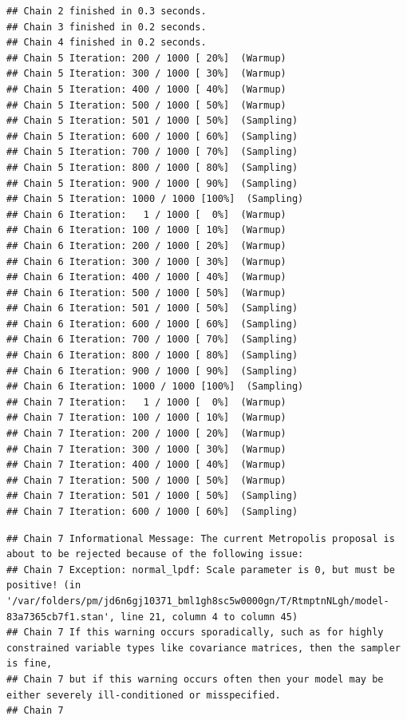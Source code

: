 \documentclass[
]{book}
\begin{document}
\begin{verbatim}
## Chain 2 finished in 0.3 seconds.
## Chain 3 finished in 0.2 seconds.
## Chain 4 finished in 0.2 seconds.
## Chain 5 Iteration: 200 / 1000 [ 20%]  (Warmup) 
## Chain 5 Iteration: 300 / 1000 [ 30%]  (Warmup) 
## Chain 5 Iteration: 400 / 1000 [ 40%]  (Warmup) 
## Chain 5 Iteration: 500 / 1000 [ 50%]  (Warmup) 
## Chain 5 Iteration: 501 / 1000 [ 50%]  (Sampling) 
## Chain 5 Iteration: 600 / 1000 [ 60%]  (Sampling) 
## Chain 5 Iteration: 700 / 1000 [ 70%]  (Sampling) 
## Chain 5 Iteration: 800 / 1000 [ 80%]  (Sampling) 
## Chain 5 Iteration: 900 / 1000 [ 90%]  (Sampling) 
## Chain 5 Iteration: 1000 / 1000 [100%]  (Sampling) 
## Chain 6 Iteration:   1 / 1000 [  0%]  (Warmup) 
## Chain 6 Iteration: 100 / 1000 [ 10%]  (Warmup) 
## Chain 6 Iteration: 200 / 1000 [ 20%]  (Warmup) 
## Chain 6 Iteration: 300 / 1000 [ 30%]  (Warmup) 
## Chain 6 Iteration: 400 / 1000 [ 40%]  (Warmup) 
## Chain 6 Iteration: 500 / 1000 [ 50%]  (Warmup) 
## Chain 6 Iteration: 501 / 1000 [ 50%]  (Sampling) 
## Chain 6 Iteration: 600 / 1000 [ 60%]  (Sampling) 
## Chain 6 Iteration: 700 / 1000 [ 70%]  (Sampling) 
## Chain 6 Iteration: 800 / 1000 [ 80%]  (Sampling) 
## Chain 6 Iteration: 900 / 1000 [ 90%]  (Sampling) 
## Chain 6 Iteration: 1000 / 1000 [100%]  (Sampling) 
## Chain 7 Iteration:   1 / 1000 [  0%]  (Warmup) 
## Chain 7 Iteration: 100 / 1000 [ 10%]  (Warmup) 
## Chain 7 Iteration: 200 / 1000 [ 20%]  (Warmup) 
## Chain 7 Iteration: 300 / 1000 [ 30%]  (Warmup) 
## Chain 7 Iteration: 400 / 1000 [ 40%]  (Warmup) 
## Chain 7 Iteration: 500 / 1000 [ 50%]  (Warmup) 
## Chain 7 Iteration: 501 / 1000 [ 50%]  (Sampling) 
## Chain 7 Iteration: 600 / 1000 [ 60%]  (Sampling)
\end{verbatim}

\begin{verbatim}
## Chain 7 Informational Message: The current Metropolis proposal is about to be rejected because of the following issue:
## Chain 7 Exception: normal_lpdf: Scale parameter is 0, but must be positive! (in '/var/folders/pm/jd6n6gj10371_bml1gh8sc5w0000gn/T/RtmptnNLgh/model-83a7365cb7f1.stan', line 21, column 4 to column 45)
## Chain 7 If this warning occurs sporadically, such as for highly constrained variable types like covariance matrices, then the sampler is fine,
## Chain 7 but if this warning occurs often then your model may be either severely ill-conditioned or misspecified.
## Chain 7
\end{verbatim}
\end{document}
